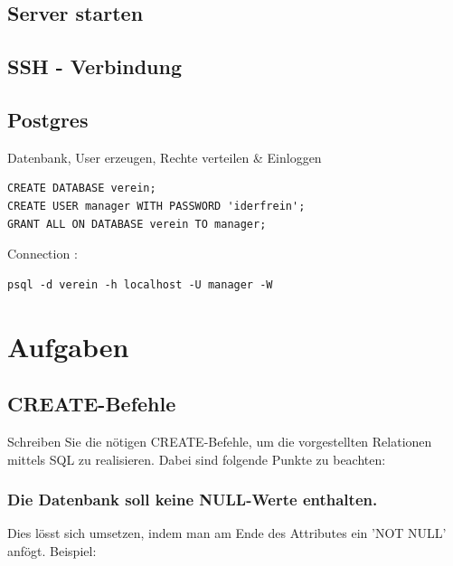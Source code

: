 \subsection{Server starten}
\subsection{SSH - Verbindung}
\subsection{Postgres}
Datenbank, User erzeugen, Rechte verteilen \& Einloggen

\lstset{language=SQL}
\begin{lstlisting}
CREATE DATABASE verein;
CREATE USER manager WITH PASSWORD 'iderfrein';
GRANT ALL ON DATABASE verein TO manager;
\end{lstlisting}

Connection :
\lstset{language=bash}
\begin{lstlisting}
psql -d verein -h localhost -U manager -W
\end{lstlisting}
\section{Aufgaben}

\subsection{CREATE-Befehle}
Schreiben Sie die nötigen CREATE-Befehle, um die vorgestellten Relationen mittels SQL zu realisieren.
Dabei sind folgende Punkte zu beachten:

\subsubsection{Die Datenbank soll keine NULL-Werte enthalten.}
Dies lösst sich umsetzen, indem man am Ende des Attributes ein 'NOT NULL' anfögt.\newline
Beispiel:


